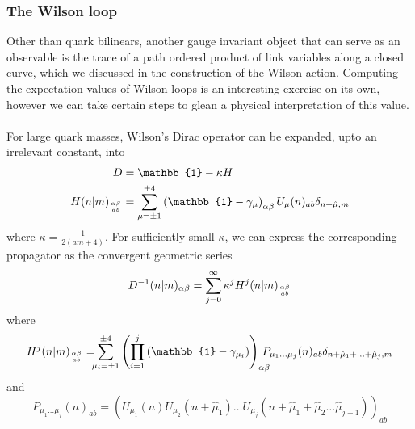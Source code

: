 \documentclass[a4paper,10pt]{article}
\begin{document}
\subsubsection{The Wilson loop}
Other than quark bilinears, another gauge invariant object that can serve as an observable is the trace of a path ordered product of link variables along a closed curve, which we discussed in the construction of the Wilson action. Computing the expectation values of Wilson loops is an interesting exercise on its own, however we can take certain steps to glean a physical interpretation of this value.\\\\For large quark masses, Wilson's Dirac operator can be expanded, upto an irrelevant constant, into 
\begin{equation}
\begin{aligned} 
D&=\mathbb{1}-\kappa H\\H(n\mkern-5mu \mid\mkern-5mu  m)_{\alpha \beta \atop a b}&=\sum_{\mu=\pm 1}^{\pm 4}\left(\mathbb{1}-\gamma_{\mu}\right)_{\alpha \beta} U_{\mu}(n)_{a b} \delta_{n+\hat{\mu}, m}
\end{aligned}
\end{equation}
where $\kappa=\frac{1}{2(a m+4)}$. For sufficiently small $\kappa$, we can express the corresponding propagator as the convergent geometric series
\begin{equation}
D^{-1}(n\mkern-5mu  \mid\mkern-5mu  m)_{\alpha \beta}=\sum_{j=0}^{\infty} \kappa^{j} H^j(n\mkern-5mu \mid\mkern-5mu  m)_{\alpha \beta \atop a b}
\end{equation}
where
\begin{equation}\label{eq:hopping_term}
H^{j}(n\mkern-5mu \mid\mkern-5mu m)_{\alpha \beta \atop a b}=\mkern-10mu\sum_{\mu_{i}=\pm 1}^{\pm 4}\left(\prod_{i=1}^{j}\left(\mathbb{1}-\gamma_{\mu_{i}}\right)\right)_{\alpha \beta}\mkern-16mu P_{\mu_{1} \ldots \mu_{j}}(n)_{a b} \delta_{n+\hat{\mu}_{1}+\ldots+\hat{\mu}_{j}, m}
\end{equation}
and
\begin{equation}
P_{\mu_{1} \ldots \mu_{j}}(n)_{a b}=\left(U_{\mu_{1}}(n) U_{\mu_{2}}\left(n+\hat{\mu}_{1}\right) \ldots U_{\mu_{j}}\left(n+\hat{\mu}_{1}+\hat{\mu}_{2} \ldots \hat{\mu}_{j-1}\right)\right)_{a b}
\end{equation}
\end{document}
